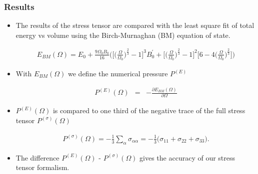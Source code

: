 \documentclass[10pt, handout]{beamer}
\newcommand{\Om}{\Omega}
\newcommand{\sig}{\sigma}
\newcommand{\al}{\alpha}
\begin{document}
	
	\begin{frame}
		\frametitle{Results}
		\begin{itemize}
			\item The results of the stress tensor are compared with the least square fit of total energy vs volume using the Birch-Murnaghan (BM) equation of state.
			\begin{small}
			\begin{eqnarray}\nonumber
				E_{BM}(\Om) = E_0 + \frac{9\Om_0B_0}{16} \Bigg( \Big[ \Big(\frac{\Om}{\Om_0} \Big)^\frac{2}{3}-1 \Big]^3 B_0^\prime + \Big[ \Big(\frac{\Om}{\Om_0} \Big)^\frac{2}{3}-1 \Big]^2 \Big[6- 4\Big(\frac{\Om}{\Om_0}\Big)^\frac{2}{3} \Big]
				\Bigg)
			\end{eqnarray}
		    \end{small}
			\item With $E_{BM}(\Om)$ we define the numerical pressure $P^{(E)}$
			\begin{small}
				\begin{eqnarray}\nonumber
					P^{(E)}(\Om) &=& -\frac{\partial E_{BM}(\Om)}{\partial \Om}  			
				\end{eqnarray}
			\end{small}
			\item $P^{(E)}(\Om)$ is compared to one third of the negative trace of the full stress tensor $P^{(\sig)}(\Om)$
            \begin{small}
            	  \begin{eqnarray}\nonumber
            		P^{(\sig)}(\Om) = -\frac{1}{3} \sum_{\al} \sigma_{\alpha \alpha}= -\frac{1}{3} \Big( \sigma_{11} + \sigma_{22}+ \sigma_{33} \Big). 
            	\end{eqnarray}
            \end{small} 
             \item The difference $P^{(E)}(\Om)$ - $P^{(\sig)}(\Om)$ gives the accuracy of our stress tensor formalism. 
		\end{itemize}
		
	\end{frame}		
		
\end{document}
